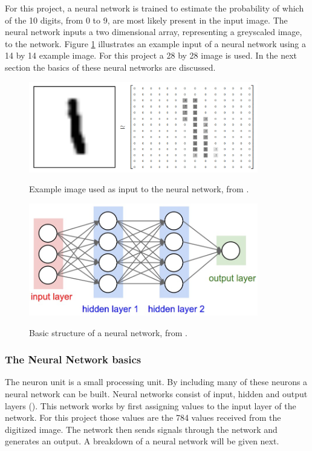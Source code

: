 For this project, a neural network is trained to estimate the probability of which of the 10 digits, from 0 to 9, are most likely present in the input image. The neural network inputs a two dimensional array, representing a greyscaled image, to the network. Figure \ref{fig:mnist} illustrates an example input of a neural network using a 14 by 14 example image. For this project a 28 by 28 image is used. In the next section the basics of these neural networks are discussed.

\begin{figure}
  \centering
  \includegraphics[width=10cm]{MNIST}\\
  \caption{Example image used as input to the neural network, from \citet{tensor2017}.}
  \label{fig:mnist}
\end{figure}

\begin{figure}
  \centering
  \includegraphics[width=10cm]{NN}\\
  \caption{Basic structure of a neural network, from \citet{karpathy2017}.} 
  \label{fig:nn}
\end{figure}

\subsubsection{The Neural Network basics}

The neuron unit is a small processing unit. By including many of these neurons a neural network can be built. Neural networks consist of input, hidden and output layers (\citet{MichealN2015}). This network works by first assigning values to the input layer of the network. For this project those values are the 784 values received from the digitized image. The network then sends signals through the network and generates an output. A breakdown of a neural network will be given next.

